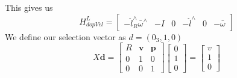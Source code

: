 This gives us 
\begin{equation}
  H^L_{dopVel}= \begin{bmatrix}-\hat l_R^\wedge \bar \omega^\wedge&-I&0&-\hat l^\wedge &0&-\bar \omega \end{bmatrix} 
\end{equation}
We define our selection vector as $d = (0_3, 1, 0)$
\begin{equation}
    X\mathbf{d}=\begin{bmatrix}
      R & \mathbf{v} & \mathbf{p} \\ 
        0 & 1 & 0 \\ 
        0 & 0 & 1
    \end{bmatrix}
    \begin{bmatrix}
        0 \\
        1 \\
        0
    \end{bmatrix}
    =\begin{bmatrix}
      v\\
      1 \\
      0
    \end{bmatrix}
  \label{eq:gps_vel_model}

\end{equation}

